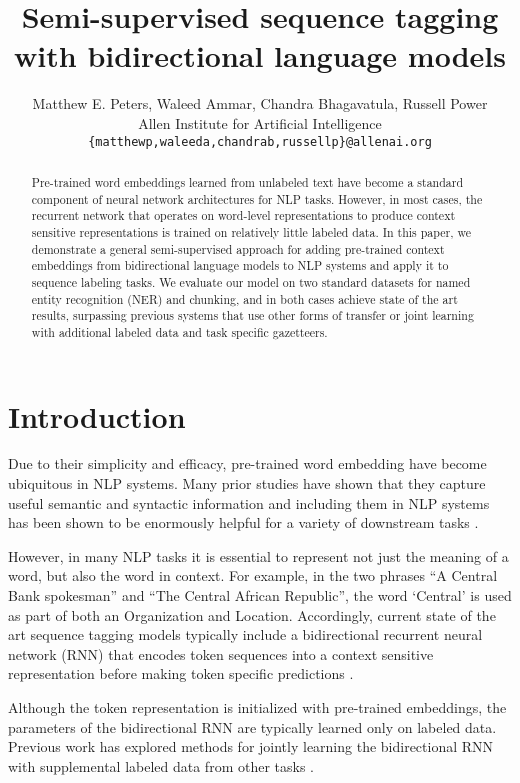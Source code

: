 \documentclass[11pt,a4paper]{article}
\title{Semi-supervised sequence tagging with bidirectional language models}
\author{Matthew E. Peters, Waleed Ammar, Chandra Bhagavatula, Russell Power \\
    Allen Institute for Artificial Intelligence \\
    {\tt \{matthewp,waleeda,chandrab,russellp\}@allenai.org}
}
\date{}
\begin{document}
\maketitle
\begin{abstract}
Pre-trained word embeddings learned from unlabeled text
have become a standard component of neural network architectures for
NLP tasks.  However, in most cases, the recurrent
network that operates on word-level representations to produce context sensitive representations is trained on relatively little labeled data.
In this paper, we demonstrate a general semi-supervised approach for adding pre-trained context embeddings from bidirectional
language models to NLP systems and apply it to sequence labeling tasks.
We evaluate our model on two standard datasets for named entity recognition (NER) and chunking,
and in both cases achieve state of the art results, surpassing previous systems
that use other forms of transfer or joint learning with additional labeled data and task specific gazetteers.
\end{abstract}

\section{Introduction}

Due to their simplicity and efficacy, pre-trained word embedding have become ubiquitous in NLP systems.
Many prior studies have shown that they capture useful semantic and syntactic information
\citep{word2vec,Pennington2014GloveGV} and including them in NLP systems has been shown to be enormously helpful for a variety of downstream tasks \citep{NLPfromScratch:Collobert2011}.

However, in many NLP tasks it is essential to represent not just the meaning of a word, but also the word in context.  For example, in the two phrases ``A Central Bank spokesman'' and ``The Central African Republic'', the word  `Central' is used as part of both an Organization and Location.  Accordingly, current state of the art sequence tagging models typically include a bidirectional recurrent neural network (RNN) that encodes token sequences into a context sensitive representation before making token specific predictions \citep{yang-transfer-iclr07,Ma2016EndtoendSL,lample-EtAl:2016:N16-1,joint-many-iclr07}.

Although the token representation is initialized with pre-trained embeddings, the parameters of the bidirectional RNN are typically learned only on labeled data.
Previous work has explored methods for jointly learning the bidirectional RNN with supplemental labeled data from other tasks \citep[e.g.,][]{Sgaard2016DeepML,yang-transfer-iclr07}.
\end{document}

